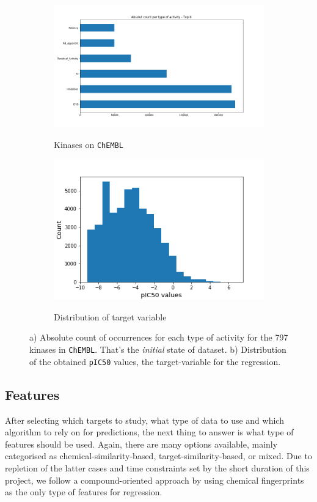 \documentclass[10pt]{article}
\newcommand{\chembl}{\texttt{ChEMBL}}
\begin{document}
\begin{figure}
	\begin{subfigure}{.53\textwidth}
		\centering
		\caption{Kinases on \chembl}
		\includegraphics[width=\textwidth]{figs/activities-all.png}
		\label{fig:chembl}
	\end{subfigure}
	\begin{subfigure}{.53\textwidth}
		\caption{Distribution of target variable} 
		\centering
		\includegraphics[width=\textwidth]{figs/TrueDistr.png}
		\label{fig:pic50}
	\end{subfigure}
\caption{{\small a) Absolute count of occurrences for each type of activity for the 797 kinases in \chembl. That's the \textit{initial} state of dataset. b) Distribution of the obtained \texttt{pIC50} values, the target-variable for the regression.} }
\end{figure}
 
\subsection{Features}
After selecting which targets to study, what type of data to use and which algorithm to rely on for predictions, the next thing to answer is what type of features should be used. Again, there are many options available, mainly categorised as chemical-similarity-based, target-similarity-based, or mixed. Due to repletion of the latter cases and time constraints set by the short duration of this project, we follow a compound-oriented approach by using chemical fingerprints as the only type of features for regression. 
\end{document}
